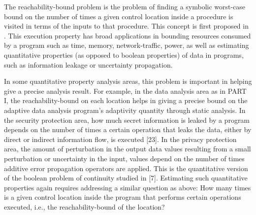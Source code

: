 The reachability-bound problem is
the problem of finding a symbolic worst-case bound on the number of times a given control location 
inside a procedure is visited in terms of the inputs to that procedure.
This concept is first proposed in \cite{GulwaniZ10}.
This execution property has broad
applications in bounding resources consumed by a program such as time, memory,
network-traffic, power, as well as estimating quantitative properties (as opposed to boolean properties)
of data in programs, such as information leakage or uncertainty propagation.

In some quantitative property analysis areas, this problem is important in helping give a precise analysis result.
For example, in the data analysis area as in PART I, the reachability-bound on each location helps
in giving a precise bound on the adaptive data analysis program's adaptivity quantity through static analysis.
In the security protection area,
how much secret information is leaked by a program depends on the number of times a certain operation that leaks the data,
either by direct or indirect information flow, is executed [23].
In the privacy protection area, the amount of perturbation in the output data values resulting
from a small perturbation or uncertainty in the input, values depend on the number of times additive error propagation operators are applied.
This is the quantitative version of the boolean problem of continuity studied in [7]. 
Estimating such quantitative properties again requires addressing a similar question as above:
How many times is a given control location inside the program that performs certain operations executed,
i.e., the
reachability-bound of the location?

